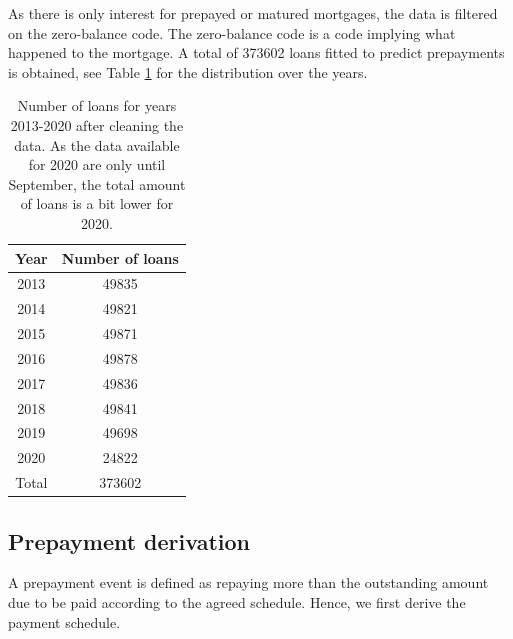     As there is only interest for 
    prepayed or matured mortgages, the data is filtered on the 
    zero-balance code. The zero-balance code is a code implying what 
    happened to the mortgage. A total of 373602 loans fitted to 
    predict prepayments is obtained, see Table 
    \ref{model_cleaned data_table} for the distribution over the 
    years. 
    \begin{table}[H]
        \centering
        \begin{tabular}{c|c}
            Year & Number of loans \\\hline
            2013 & 49835 \\
            2014 & 49821 \\
            2015 & 49871 \\
            2016 & 49878 \\
            2017 & 49836 \\
            2018 & 49841 \\
            2019 & 49698 \\
            2020 & 24822 \\\hline
            Total & 373602 
		\end{tabular}
		\caption{
            Number of loans for years 2013-2020 after 
            cleaning the data. As the  
            data available for 2020 are only until September, 
            the total amount of loans is a bit lower for 
            2020. 
            }
		\label{model_cleaned data_table}
    \end{table}
    
\subsection{Prepayment derivation}
    A prepayment event is defined as repaying more than the outstanding amount due to be paid 
    according to the agreed schedule. 
    Hence, we first derive the payment schedule. 
    
